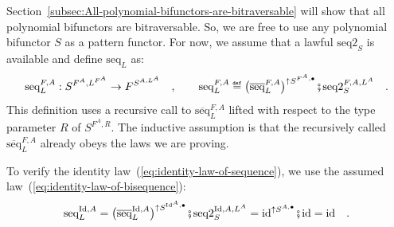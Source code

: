 Section~\ref{subsec:All-polynomial-bifunctors-are-bitraversable}
will show that all polynomial bifunctors are bitraversable. So, we
are free to use any polynomial bifunctor $S$ as a pattern functor.
For now, we assume that a lawful $\text{seq2}_{S}$ is available and
define $\text{seq}_{L}$ as:
\[
\text{seq}_{L}^{F,A}:S^{F^{A},L^{F^{A}}}\rightarrow F^{S^{A,L^{A}}}\quad,\quad\quad\text{seq}_{L}^{F,A}\triangleq\big(\overline{\text{seq}}_{L}^{F,A}\big)^{\uparrow S^{F^{A},\bullet}}\bef\text{seq2}_{S}^{F,A,L^{A}}\quad.
\]
This definition uses a recursive call to $\overline{\text{seq}}_{L}^{F,A}$
lifted with respect to the type parameter $R$ of $S^{F^{A},R}$.
The inductive assumption is that the recursively called $\overline{\text{seq}}_{L}^{F,A}$
already obeys the laws we are proving.

To verify the identity law~(\ref{eq:identity-law-of-sequence}),
we use the assumed law~(\ref{eq:identity-law-of-bisequence}):
\[
\text{seq}_{L}^{\text{Id},A}=\big(\overline{\text{seq}}_{L}^{\text{Id},A}\big)^{\uparrow S^{\text{Id}^{A},\bullet}}\bef\text{seq2}_{S}^{\text{Id},A,L^{A}}=\text{id}^{\uparrow S^{A,\bullet}}\bef\text{id}=\text{id}\quad.
\]

